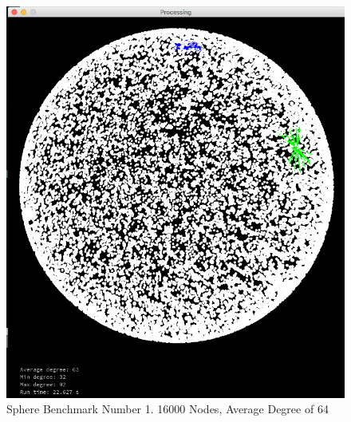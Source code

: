 \documentclass{article}
\begin{document}
\begin{figure}
    \centering
    \includegraphics[scale=0.45]{./images/sphere_0.png}
    \caption{Sphere Benchmark Number 1. 16000 Nodes, Average Degree of 64}
    \label{sphere0}
\end{figure}
\end{document}
